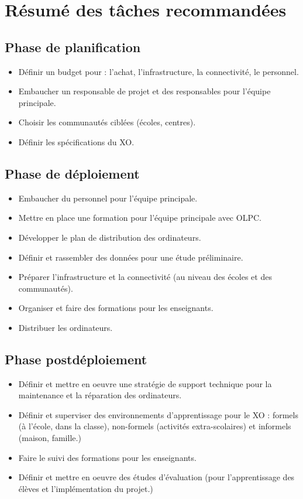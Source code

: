 \documentclass[11pt]{article}
\begin{document}
\section{Résumé des tâches recommandées}
\label{sec-11}
\subsection{Phase de planification}
\label{sec-11-1}


\begin{itemize}
\item Définir un budget pour : l'achat, l'infrastructure, la connectivité, le
  personnel.
\item Embaucher un responsable de projet et des responsables pour l'équipe
  principale.
\item Choisir les communautés ciblées (écoles, centres).
\item Définir les spécifications du XO.
\end{itemize}
\subsection{Phase de déploiement}
\label{sec-11-2}


\begin{itemize}
\item Embaucher du personnel pour l'équipe principale.
\item Mettre en place une formation pour l'équipe principale avec OLPC.
\item Développer le plan de distribution des ordinateurs.
\item Définir et rassembler des données pour une étude préliminaire.
\item Préparer l'infrastructure et la connectivité (au niveau des écoles et des
  communautés).
\item Organiser et faire des formations pour les enseignants.
\item Distribuer les ordinateurs.
\end{itemize}
\subsection{Phase postdéploiement}
\label{sec-11-3}


\begin{itemize}
\item Définir et mettre en oeuvre une stratégie de support technique pour la
  maintenance et la réparation des ordinateurs.
\item Définir et superviser des environnements d'apprentissage pour le XO :
  formels (à l'école, dans la classe), non-formels (activités
  extra-scolaires) et informels (maison, famille.)
\item Faire le suivi des formations pour les enseignants.
\item Définir et mettre en oeuvre des études d'évaluation (pour l'apprentissage
  des élèves et l'implémentation du projet.)
\end{itemize}
\end{document}
